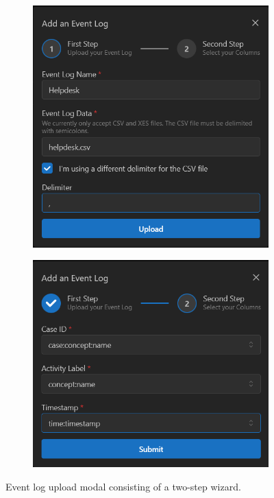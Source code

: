 \begin{figure}
    \centering
    \begin{subfigure}[b]{0.45\textwidth}
        \centering
        \includegraphics[width=\textwidth]{figures/screenshots/upload1.png}
    \end{subfigure}
    \begin{subfigure}[b]{0.45\textwidth}
        \centering
        \includegraphics[width=\textwidth]{figures/screenshots/upload2.png}
    \end{subfigure}
    \caption{Event log upload modal consisting of a two-step wizard.}
    \label{fig:upload-modal}
\end{figure}